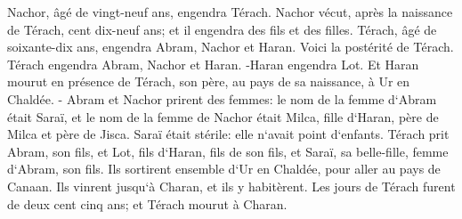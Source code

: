 \verse Nachor, âgé de vingt-neuf ans, engendra Térach. 
\verse Nachor vécut, après la naissance de Térach, cent dix-neuf ans; et il engendra des fils et des filles. 
\verse Térach, âgé de soixante-dix ans, engendra Abram, Nachor et Haran. 
\verse Voici la postérité de Térach. Térach engendra Abram, Nachor et Haran. -Haran engendra Lot. 
\verse Et Haran mourut en présence de Térach, son père, au pays de sa naissance, à Ur en Chaldée. - 
\verse Abram et Nachor prirent des femmes: le nom de la femme d`Abram était Saraï, et le nom de la femme de Nachor était Milca, fille d`Haran, père de Milca et père de Jisca. 
\verse Saraï était stérile: elle n`avait point d`enfants. 
\verse Térach prit Abram, son fils, et Lot, fils d`Haran, fils de son fils, et Saraï, sa belle-fille, femme d`Abram, son fils. Ils sortirent ensemble d`Ur en Chaldée, pour aller au pays de Canaan. Ils vinrent jusqu`à Charan, et ils y habitèrent. 
\verse Les jours de Térach furent de deux cent cinq ans; et Térach mourut à Charan. 

